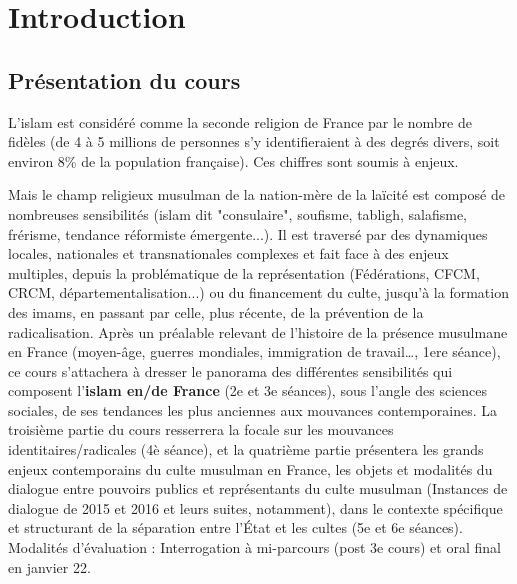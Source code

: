 \chapter{Introduction}


\section{Présentation du cours} 
L’islam est considéré comme la seconde religion de France par
le nombre de fidèles (de 4 à 5 millions de personnes s'y identifieraient à des degrés
divers, soit environ 8\% de la population française). Ces chiffres sont soumis à enjeux.

Mais le champ religieux musulman
de la nation-mère de la laïcité est composé de nombreuses sensibilités (islam dit
"consulaire", soufisme, tabligh, salafisme, frérisme, tendance réformiste émergente...).
Il est traversé par des dynamiques locales, nationales et transnationales complexes et
fait face à des enjeux multiples, depuis la problématique de la représentation
(Fédérations, CFCM, CRCM, départementalisation...) ou du financement du culte,
jusqu'à la formation des imams, en passant par celle, plus récente, de la prévention de la
radicalisation. Après un préalable relevant de l’histoire de la présence musulmane en
France (moyen-âge, guerres mondiales, immigration de travail…, 1ere séance), ce cours
s'attachera à dresser le panorama des différentes sensibilités qui composent l'\textbf{islam en/de
France} (2e et 3e
séances), sous l’angle des sciences sociales, de ses tendances les plus
anciennes aux mouvances contemporaines. La troisième partie du cours resserrera la
focale sur les mouvances identitaires/radicales (4è séance), et la quatrième partie
présentera les grands enjeux contemporains du culte musulman en France, les objets et
modalités du dialogue entre pouvoirs publics et représentants du culte musulman
(Instances de dialogue de 2015 et 2016 et leurs suites, notamment), dans le contexte
spécifique et structurant de la séparation entre l’État et les cultes (5e
et 6e
séances).
Modalités d’évaluation : Interrogation à mi-parcours (post 3e
cours) et oral final en janvier 22.


